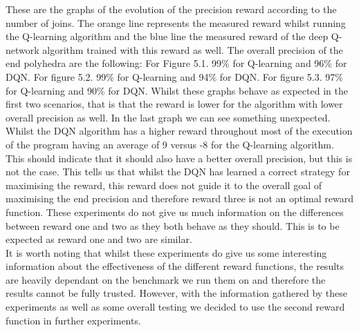 These are the graphs of the evolution of the precision reward according to the number of joins. The orange line represents the measured reward whilst running the Q-learning algorithm and the blue line the measured reward of the deep Q-network algorithm trained with this reward as well. The overall precision of the end polyhedra are the following: For Figure 5.1. 99\% for Q-learning and 96\% for DQN. For figure 5.2. 99\% for Q-learning and 94\% for DQN. For figure 5.3. 97\% for Q-learning and 90\% for DQN. Whilst these graphs behave as expected in the first two scenarios, that is that the reward is lower for the algorithm with lower overall precision as well. In the last graph we can see something unexpected. Whilst the DQN algorithm has a higher reward throughout most of the execution of the program having an average of 9 versus -8 for the Q-learning algorithm. This should indicate that it should also have a better overall precision, but this is not the case. This tells us that whilst the DQN has learned a correct strategy for maximising the reward, this reward does not guide it to the overall goal of maximising the end precision and therefore reward three is not an optimal reward function. These experiments do not give us much information on the differences between reward one and two as they both behave as they should. This is to be expected as reward one and two are similar.\\
It is worth noting that whilst these experiments do give us some interesting information about the effectiveness of the different reward functions, the results are heavily dependant on the benchmark we run them on and therefore the results cannot be fully trusted. However, with the information gathered by these experiments as well as some overall testing we decided to use the second reward function in further experiments.


